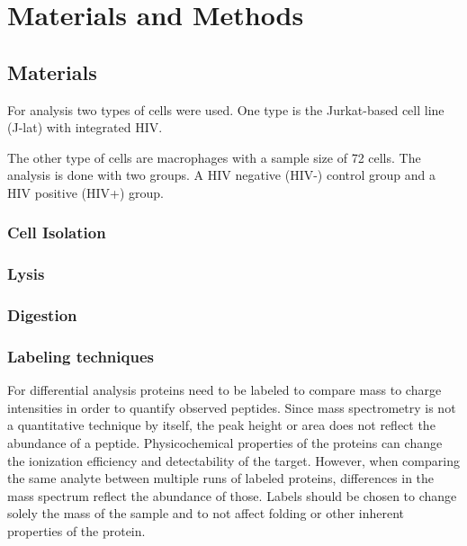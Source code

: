 \documentclass[
]{article}
\author{}
\date{\vspace{-2.5em}}
\begin{document}
\hypertarget{materials-and-methods}{%
\section{Materials and Methods}\label{materials-and-methods}}

\hypertarget{materials}{%
\subsection{Materials}\label{materials}}

For analysis two types of cells were used. One type is the Jurkat-based
cell line (J-lat) with integrated HIV.

The other type of cells are macrophages with a sample size of 72 cells.
The analysis is done with two groups. A HIV negative (HIV-) control
group and a HIV positive (HIV+) group.

\hypertarget{cell-isolation}{%
\subsubsection{Cell Isolation}\label{cell-isolation}}

\hypertarget{lysis}{%
\subsubsection{Lysis}\label{lysis}}

\hypertarget{digestion}{%
\subsubsection{Digestion}\label{digestion}}

\hypertarget{labeling-techniques}{%
\subsubsection{Labeling techniques}\label{labeling-techniques}}

For differential analysis proteins need to be labeled to compare mass to
charge intensities in order to quantify observed peptides. Since mass
spectrometry is not a quantitative technique by itself, the peak height
or area does not reflect the abundance of a peptide. Physicochemical
properties of the proteins can change the ionization efficiency and
detectability of the target. However, when comparing the same analyte
between multiple runs of labeled proteins, differences in the mass
spectrum reflect the abundance of those. Labels should be chosen to
change solely the mass of the sample and to not affect folding or other
inherent properties of the protein.
\end{document}
